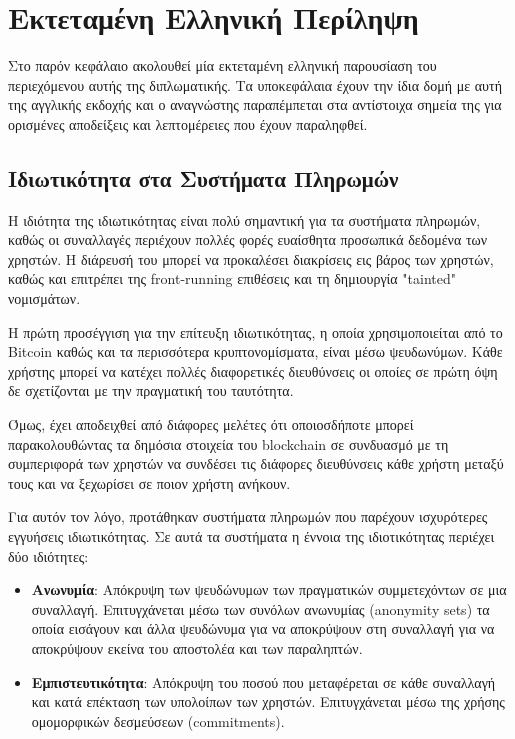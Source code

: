 \chapter{Εκτεταμένη Ελληνική Περίληψη}

Στο παρόν κεφάλαιο ακολουθεί μία εκτεταμένη ελληνική παρουσίαση του περιεχόμενου αυτής της διπλωματικής. Τα υποκεφάλαια έχουν την ίδια δομή με αυτή της αγγλικής εκδοχής και ο αναγνώστης παραπέμπεται στα αντίστοιχα σημεία της για ορισμένες αποδείξεις και λεπτομέρειες που έχουν παραληφθεί. 

\section{Ιδιωτικότητα στα Συστήματα Πληρωμών}
Η ιδιότητα της ιδιωτικότητας είναι πολύ σημαντική για τα συστήματα πληρωμών, καθώς οι συναλλαγές περιέχουν πολλές φορές ευαίσθητα προσωπικά δεδομένα των χρηστών. Η διάρευσή του μπορεί να προκαλέσει διακρίσεις εις βάρος των χρηστών, καθώς και επιτρέπει της front-running επιθέσεις και τη δημιουργία "tainted" νομισμάτων.

Η πρώτη προσέγγιση για την επίτευξη ιδιωτικότητας, η οποία χρησιμοποιείται από το Bitcoin καθώς και τα περισσότερα κρυπτονομίσματα, είναι μέσω ψευδωνύμων. Κάθε χρήστης μπορεί να κατέχει πολλές διαφορετικές διευθύνσεις οι οποίες σε πρώτη όψη δε σχετίζονται με την πραγματική του ταυτότητα. 

Όμως, έχει αποδειχθεί από διάφορες μελέτες ότι οποιοσδήποτε μπορεί παρακολουθώντας τα δημόσια στοιχεία του blockchain σε συνδυασμό με τη συμπεριφορά των χρηστών να συνδέσει τις διάφορες διευθύνσεις κάθε χρήστη μεταξύ τους και να ξεχωρίσει σε ποιον χρήστη ανήκουν.

Για αυτόν τον λόγο, προτάθηκαν συστήματα πληρωμών που παρέχουν ισχυρότερες εγγυήσεις ιδιωτικότητας. Σε αυτά τα συστήματα η έννοια της ιδιοτικότητας περιέχει δύο ιδιότητες:
\begin{itemize}
    \item \textbf{Ανωνυμία}: Απόκρυψη των ψευδώνυμων των πραγματικών συμμετεχόντων σε μια συναλλαγή. Επιτυγχάνεται μέσω των συνόλων ανωνυμίας (anonymity sets) τα οποία εισάγουν και άλλα ψευδώνυμα για να αποκρύψουν στη συναλλαγή για να αποκρύψουν εκείνα του αποστολέα και των παραληπτών.
    \item \textbf{Εμπιστευτικότητα}: Απόκρυψη του ποσού που μεταφέρεται σε κάθε συναλλαγή και κατά επέκταση των υπολοίπων των χρηστών. Επιτυγχάνεται μέσω της χρήσης ομομορφικών δεσμεύσεων (commitments).
\end{itemize}

